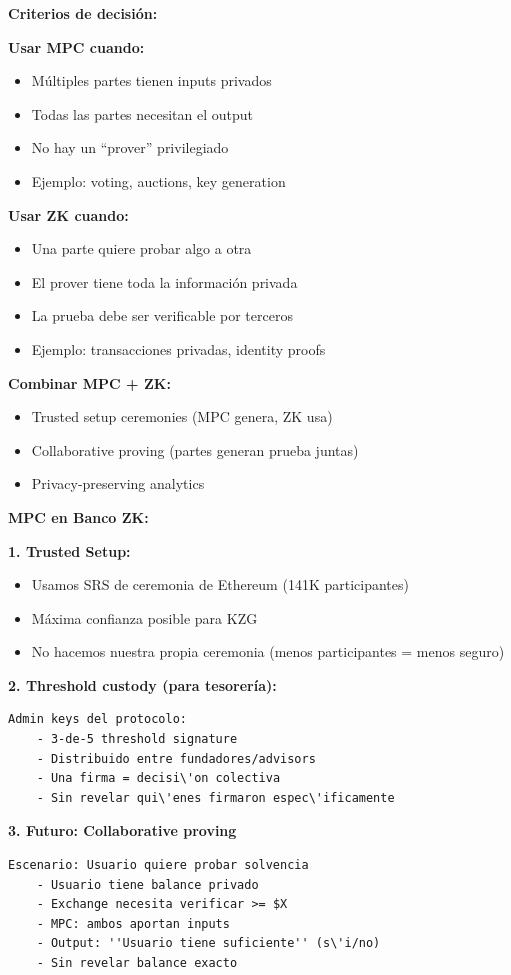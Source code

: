 \documentclass[11pt,a4paper,twoside]{book}
\begin{document}
\begin{remark}
\textbf{Criterios de decisi\'on:}

\textbf{Usar MPC cuando:}
\begin{itemize}
    \item M\'ultiples partes tienen inputs privados
    \item Todas las partes necesitan el output
    \item No hay un ``prover'' privilegiado
    \item Ejemplo: voting, auctions, key generation
\end{itemize}

\textbf{Usar ZK cuando:}
\begin{itemize}
    \item Una parte quiere probar algo a otra
    \item El prover tiene toda la informaci\'on privada
    \item La prueba debe ser verificable por terceros
    \item Ejemplo: transacciones privadas, identity proofs
\end{itemize}

\textbf{Combinar MPC + ZK:}
\begin{itemize}
    \item Trusted setup ceremonies (MPC genera, ZK usa)
    \item Collaborative proving (partes generan prueba juntas)
    \item Privacy-preserving analytics
\end{itemize}
\end{remark}

\begin{bancozk}
\textbf{MPC en Banco ZK:}

\textbf{1. Trusted Setup:}
\begin{itemize}
    \item Usamos SRS de ceremonia de Ethereum (141K participantes)
    \item M\'axima confianza posible para KZG
    \item No hacemos nuestra propia ceremonia (menos participantes = menos seguro)
\end{itemize}

\textbf{2. Threshold custody (para tesorer\'ia):}
\begin{verbatim}
Admin keys del protocolo:
    - 3-de-5 threshold signature
    - Distribuido entre fundadores/advisors
    - Una firma = decisi\'on colectiva
    - Sin revelar qui\'enes firmaron espec\'ificamente
\end{verbatim}

\textbf{3. Futuro: Collaborative proving}
\begin{verbatim}
Escenario: Usuario quiere probar solvencia
    - Usuario tiene balance privado
    - Exchange necesita verificar >= $X
    - MPC: ambos aportan inputs
    - Output: ''Usuario tiene suficiente'' (s\'i/no)
    - Sin revelar balance exacto
\end{verbatim}
\end{bancozk}
\end{document}
